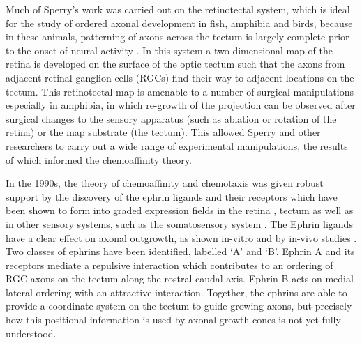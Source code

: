 \documentclass[9pt,lineno]{elife}
\begin{document}
Much of Sperry's work was carried out on the retinotectal system, which is ideal for the study of ordered axonal development in fish, amphibia and birds, because in these animals, patterning of axons across the tectum is largely complete prior to the onset of neural activity \citep{oleary_molecular_1999}.
In this system a two-dimensional map of  the retina is developed on the surface of the optic tectum such that the axons from adjacent retinal ganglion cells (RGCs) find their way to adjacent locations on the tectum. 
This retinotectal map is amenable to a number of surgical manipulations especially in amphibia, in which re-growth of the projection can be observed after surgical changes to the sensory apparatus (such as ablation or rotation of the retina) or the map substrate (the tectum).
This allowed Sperry and other researchers to carry out a wide range of experimental manipulations, the results of which informed the chemoaffinity theory. 

In the 1990s, the theory of chemoaffinity and chemotaxis was given robust support by the discovery of the ephrin ligands and their receptors \citep{cheng_complementary_1995,drescher_vitro_1995} which have been shown to form into graded expression fields in the retina \citep{braisted_graded_1997}, tectum \citep{braisted_graded_1997,feldheim_genetic_2000} as well as in other sensory systems, such as the somatosensory system \citep{vanderhaeghen_mapping_2000}. %
%
The Ephrin ligands have a clear effect on axonal outgrowth, as shown in-vitro \citep{cheng_complementary_1995,drescher_vitro_1995,hansen_retinal_2004} and by in-vivo studies \citep{frisen_ephrin-a5_1998,rodger_transient_2000,mann_topographic_2002,hindges_ephb_2002}.
Two classes of ephrins have been identified, labelled `A' and `B'.
Ephrin A and its receptors mediate a repulsive interaction which contributes to an ordering of RGC axons on the tectum along the rostral-caudal axis. Ephrin B acts on medial-lateral ordering with an attractive interaction. 
Together, the ephrins are able to provide a coordinate system on the tectum to guide growing axons, but precisely how this positional information is used by axonal growth cones is not yet fully understood.
\end{document}
